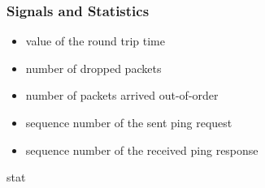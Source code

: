 \subsubsection*{Signals and Statistics}

\begin{itemize}
  \item {} value of the round trip time
  \item {} number of dropped packets
  \item {} number of packets arrived out-of-order
  \item {} sequence number of the sent ping request
  \item {} sequence number of the received ping response
\end{itemize}

 stat



